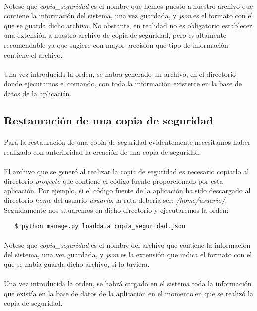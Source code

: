   \paragraph{}Nótese que \textit{copia\_seguridad} es el nombre que hemos puesto
  a nuestro archivo que contiene la información del sistema, una vez guardada,
  y \textit{json} es el formato con el que se guarda dicho archivo. No obstante,
  en realidad no es obligatorio establecer una extensión a nuestro archivo de
  copia de seguridad, pero es altamente recomendable ya que sugiere con mayor
  precisión qué tipo de información contiene el archivo.

  \paragraph{}Una vez introducida la orden, se habrá generado un archivo, en el
  directorio donde ejecutamos el comando, con toda la información existente
  en la base de datos de la aplicación.

\subsection{Restauración de una copia de seguridad}

  \paragraph{}Para la restauración de una copia de seguridad evidentemente
  necesitamos haber realizado con anterioridad la creación de una copia de
  seguridad.

  \paragraph{}El archivo que se generó al realizar la copia de seguridad es
  necesario copiarlo al directorio \textit{proyecto} que contiene el código
  fuente proporcionado por esta aplicación. Por ejemplo, si el código fuente de
  la aplicación ha sido descargado al directorio \textit{home} del usuario
  \textit{usuario}, la ruta debería ser: \textit{/home/usuario/}. Seguidamente
  nos situaremos en dicho directorio y ejecutaremos la orden:

   \begin{verbatim}
   $ python manage.py loaddata copia_seguridad.json
   \end{verbatim}

  \paragraph{}Nótese que \textit{copia\_seguridad} es el nombre del archivo que
  contiene la información del sistema, una vez guardada, y \textit{json} es la
  extensión que indica el formato con el que se había guarda dicho archivo, si
  lo tuviera.

  \paragraph{}Una vez introducida la orden, se habrá cargado en el sistema toda
  la información que existía en la base de datos de la aplicación en el momento
  en que se realizó la copia de seguridad.
